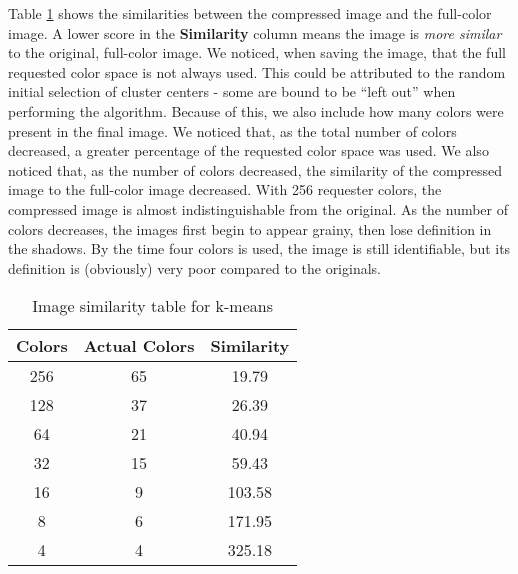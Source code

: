 \documentclass[letter,11pt,titlepage]{article}
\begin{document}
Table \ref{tab:km-sim} shows the similarities between the compressed image and the full-color image. A lower score in the \textbf{Similarity} column means the image is \textit{more similar} to the original, full-color image. We noticed, when saving the image, that the full requested color space is not always used. This could be attributed to the random initial selection of cluster centers - some are bound to be  ``left out'' when performing the algorithm. Because of this, we also include how many colors were present in the final image. We noticed that, as the total number of colors decreased, a greater percentage of the requested color space was used. We also noticed that, as the number of colors decreased, the similarity of the compressed image to the full-color image decreased. With 256 requester colors, the compressed image is almost indistinguishable from the original. As the number of colors decreases, the images first begin to appear grainy, then lose definition in the shadows. By the time four colors is used, the image is still identifiable, but its definition is (obviously) very poor compared to the originals.

\begin{table}[H]
    \centering
    \begin{tabular}{||c|c|c||}
        \hline
        \hline
        \textbf{Colors}     &   \textbf{Actual Colors}      &       \textbf{Similarity} \\
        \hline
        256                 &   65                          &       19.79               \\
        \hline
        128                 &   37                          &       26.39               \\
        \hline
        64                  &   21                          &       40.94               \\
        \hline
        32                  &   15                          &       59.43               \\
        \hline
        16                  &   9                           &       103.58              \\
        \hline
        8                   &   6                           &       171.95              \\
        \hline
        4                   &   4                           &       325.18              \\
        \hline
        \hline
    \end{tabular}
    \caption{Image similarity table for k-means}
    \label{tab:km-sim}
\end{table}
\end{document}
